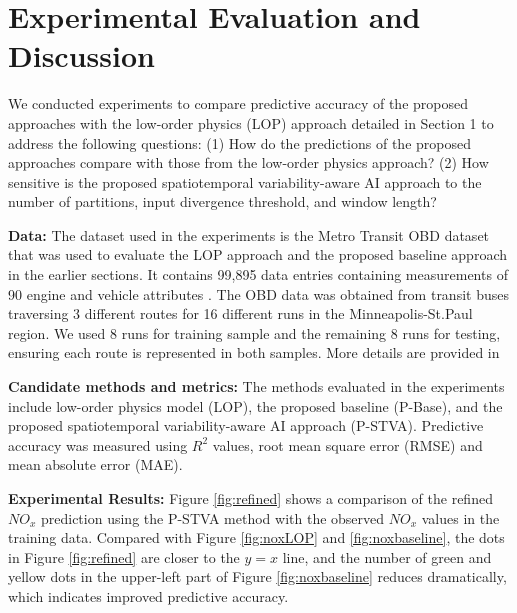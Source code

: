 \documentclass[letterpaper]{article} %
\begin{document}
\section{Experimental Evaluation and Discussion}
We conducted experiments to compare predictive accuracy of the proposed approaches with the low-order physics (LOP) approach detailed in Section 1 \cite{HeX.2008Livc} to address the following questions: (1) How do the predictions of the proposed approaches compare with those from the low-order physics approach? (2) How sensitive is the proposed spatiotemporal variability-aware AI approach to the number of partitions, input divergence threshold, and window length?  


\textbf{Data:} The dataset used in the experiments is the Metro Transit OBD dataset that was used to evaluate the LOP approach and the proposed baseline approach in the earlier sections. It contains 99,895 data entries containing measurements of 90 engine and vehicle attributes . The OBD data was obtained from transit buses traversing 3 different routes for 16 different runs in the Minneapolis-St.Paul region. We used 8 runs for training sample and the remaining 8 runs for testing, ensuring each route is represented in both samples. More details are provided in \cite{panneerselvam2020}

\textbf{Candidate methods and metrics:} The methods evaluated in the experiments include low-order physics model (LOP), the proposed baseline (P-Base), and the proposed spatiotemporal variability-aware AI approach (P-STVA). Predictive accuracy was measured using \textbf{ $R^{2}$ } values, root mean square error (RMSE) and mean absolute error (MAE).

\textbf{Experimental Results:} Figure \ref{fig:refined} shows a comparison of the refined $NO_x$ prediction using the P-STVA method with the observed $NO_x$ values in the training data. Compared with Figure \ref{fig:noxLOP} and \ref{fig:noxbaseline}, the dots in Figure \ref{fig:refined} are closer to the $y=x$ line, and the number of green and yellow dots in the upper-left part of Figure \ref{fig:noxbaseline} reduces dramatically, which indicates improved predictive accuracy.
\end{document}
